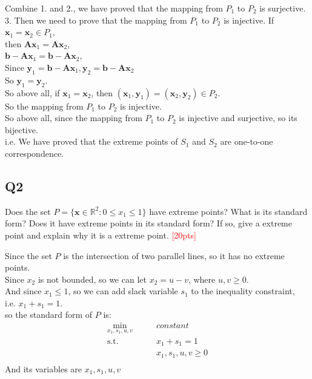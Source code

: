\documentclass[10pt]{article}
\renewcommand{\mathbf}{\boldsymbol}
\begin{document}
Combine 1. and 2., we have proved that the mapping from $P_1$ to $P_2$ is surjective.\\

3. Then we need to prove that the mapping from $P_1$ to $P_2$ is injective.
If $\mathbf{x}_1=\mathbf{x}_2\in P_1$,\\
then $\mathbf{A}\mathbf{x}_1=\mathbf{A}\mathbf{x}_2$,\\
$\mathbf{b}-\mathbf{A}\mathbf{x}_1=\mathbf{b}-\mathbf{A}\mathbf{x}_2$,\\
Since $\mathbf{y}_1=\mathbf{b}-\mathbf{A}\mathbf{x}_1,\mathbf{y}_2=\mathbf{b}-\mathbf{A}\mathbf{x}_2$\\
So $\mathbf{y}_1=\mathbf{y}_2$.\\
So above all, if $\mathbf{x}_1=\mathbf{x}_2$, then $(\mathbf{x}_1,\mathbf{y}_1)=(\mathbf{x}_2,\mathbf{y}_2)\in P_2$.\\
So the mapping from $P_1$ to $P_2$ is injective.\\

So above all, since the mapping from $P_1$ to $P_2$ is injective and surjective, so its bijective.\\
i.e. We have proved that the extreme points of $S_1$ and $S_2$ are one-to-one correspondence.\\

\newpage
\subsection{Q2}
Does the set $P = \{ \bm{x} \in \mathbb{R}^{2} : 0 \leq x_{1} \leq 1 \}$ have extreme points? What is its standard form? Does it have extreme points in its standard form? If so, give a extreme point and explain why it is a extreme point.
\textcolor{red}{[20pts]}

Since the set $P$ is the intersection of two parallel lines, so it has no extreme points.\\

Since $x_2$ is not bounded, so we can let $x_2=u-v$, where $u,v\geq 0$.\\
And since $x_1\leq 1$, so we can add slack variable $s_1$ to the inequality constraint,\\
i.e. $x_1+s_1=1$.\\

so the standard form of $P$ is:\\
\begin{equation}
	\begin{aligned}
		\min_{x_1,s_1,u,v}\qquad & constant \\ 
		\mathrm{s.t.}\qquad & x_1+s_1=1 \\
							& x_1,s_1,u,v\geq 0 \\
	\end{aligned}
\end{equation}
And its variables are $x_1,s_1,u,v$
\end{document}
